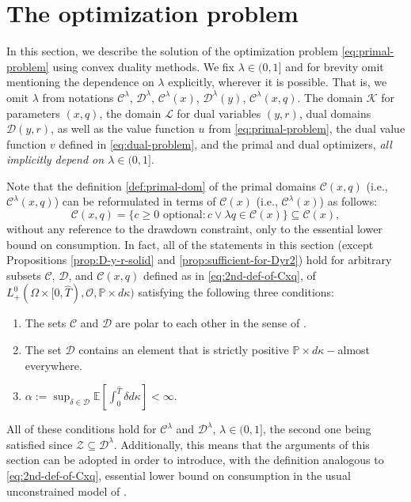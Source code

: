 \documentclass[11pt, oneside]{article}   	%
\theoremstyle{plain}
\theoremstyle{definition}
\theoremstyle{remark}
\begin{document}
\section{The optimization problem}\label{sec:optimization}

In this section, we describe the solution of the optimization problem \eqref{eq:primal-problem} using convex duality methods. We fix $\lambda\in(0,1]$ and for brevity omit mentioning the dependence on $\lambda$ explicitly, wherever it is possible. That is, we omit $\lambda$ from notations $\mathcal{C}^\lambda$, $\mathcal{D}^\lambda$, $\mathcal{C}^\lambda(x)$, $\mathcal{D}^\lambda(y)$, $\mathcal{C}^\lambda(x,q)$. The domain $\mathcal{K}$ for parameters $(x,q)$, the domain $\mathcal{L}$ for dual variables $(y,r)$, dual domains $\mathcal{D}(y,r)$, as well as the value function $u$ from \eqref{eq:primal-problem}, the dual value function $v$ defined in \eqref{eq:dual-problem}, and the primal and dual optimizers, \textit{all implicitly depend on $\lambda\in(0,1]$}.

Note that the definition \eqref{def:primal-dom} of the primal domains $\mathcal{C}(x,q)$ (i.e., $\mathcal{C}^\lambda(x,q)$) can be reformulated in terms of $\mathcal{C}(x)$ (i.e., $\mathcal{C}^\lambda(x)$) as follows:
\begin{equation}\label{eq:2nd-def-of-Cxq}
\mathcal{C}(x,q)=\{c\geq 0 \text{ optional}: c\vee \lambda q\in\mathcal{C}(x)\}\subseteq \mathcal{C}(x),
\end{equation}
without any reference to the drawdown constraint, only to the essential lower bound on consumption. In fact, all of the statements in this section (except Propositions \ref{prop:D-y-r-solid} and \ref{prop:sufficient-for-Dyr2}) hold for arbitrary subsets $\mathcal{C}$, $\mathcal{D}$, and $\mathcal{C}(x,q)$ defined as in \eqref{eq:2nd-def-of-Cxq}, of  $L_+^0(\Omega\times[0,\hat{T}),\mathcal{O},\mathbb{P}\times d\kappa)$ satisfying the following three conditions:
\begin{enumerate}
\item The sets $\mathcal{C}$ and $\mathcal{D}$ are polar to each other in the sense of \cite{bipolar}.
\item The set $\mathcal{D}$ contains an element that is strictly positive $\mathbb{P}\times d\kappa-$almost everywhere.
\item $\alpha:=\sup_{\delta\in\mathcal{D}}\mathbb{E}\left[\int_0^{\hat{T}} \delta d\kappa\right]<\infty$.
\end{enumerate}
All of these conditions hold for $\mathcal{C}^\lambda$ and $\mathcal{D}^\lambda$, $\lambda\in(0,1]$, the second one being satisfied since $\mathcal{Z}\subseteq\mathcal{D}^\lambda$. Additionally, this means that the arguments of this section can be adopted in order to introduce, with the definition analogous to \eqref{eq:2nd-def-of-Cxq}, essential lower bound on consumption in the usual unconstrained model of \cite{mostovyi}.
 
\end{document}

